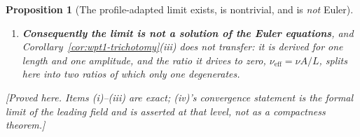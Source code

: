 \documentclass[11pt]{article}
\newtheorem{proposition}[theorem]{Proposition}
\theoremstyle{definition}
\theoremstyle{remark}
\newcommand{\abs}[1]{\left|#1\right|}
\begin{document}
\begin{proposition}[The profile-adapted limit exists, is nontrivial, and is
  \emph{not} Euler]
\begin{enumerate}[label=\textup{(\roman*)},leftmargin=2.6em]
\begin{align*}
        \partial_sv_z+v_r\partial_\rho v_z+v_z\partial_\zeta v_z
          +\partial_\zeta\tilde q
          &=\nu\Bigl(\partial_\rho^2+\frac{\partial_\rho}{\rho}\Bigr)v_z,
        \qquad
        \frac1\rho\partial_\rho(\rho v_r)+\partial_\zeta v_z=0 .
      \end{align*}
      It is closed: $v_r$ is recovered from continuity, $\tilde q$ from
      \eqref{eq:wpt2-cyclo} up to a free function $\tilde q_0(\zeta,s)$, and
      $v_\theta,v_z$ evolve. It is nontrivial: the rescaled leading field
      converges to the profile itself, since
      $A_\theta q^{-A}\to\abs{s}^{-A}$, $X\to\rho^2/(2\abs{s})$ and
      $\eta\to\zeta\abs{s}^{-D}$, giving the explicit self-similar ancient
      solution $v_\theta=\abs{s}^{-A}E$, $v_z=\abs{s}^{-A}U$.
    \item \textbf{Consequently the limit is not a solution of the Euler
      equations}, and Corollary~\ref{cor:wpt1-trichotomy}(iii) does not
      transfer: it is derived for one length and one amplitude, and the ratio
      it drives to zero, $\nu_{\mathrm{eff}}=\nu A/L$, splits here into two
      ratios of which only one degenerates.
  \end{enumerate}
  \emph{[Proved here. Items (i)--(iii) are exact; (iv)'s convergence
  statement is the formal limit of the leading field and is asserted at that
  level, not as a compactness theorem.]}
\end{proposition}
\end{document}
